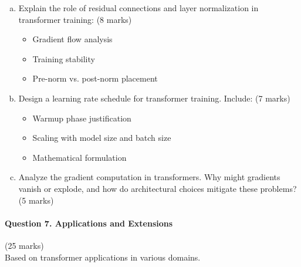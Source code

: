 \documentclass[12pt]{article}
\newcommand{\shortanswer}{\vspace{2cm}}
\newcommand{\mediumanswer}{\vspace{3cm}}
\begin{document}
\begin{enumerate}[(a)]
    \item Explain the role of residual connections and layer normalization in transformer training: \hfill (8 marks)
    \begin{itemize}
        \item Gradient flow analysis
        \item Training stability
        \item Pre-norm vs. post-norm placement
    \end{itemize}
    
    \mediumanswer
    
    \item Design a learning rate schedule for transformer training. Include: \hfill (7 marks)
    \begin{itemize}
        \item Warmup phase justification
        \item Scaling with model size and batch size
        \item Mathematical formulation
    \end{itemize}
    
    \mediumanswer
    
    \item Analyze the gradient computation in transformers. Why might gradients vanish or explode, and how do architectural choices mitigate these problems? \hfill (5 marks)
    
    \shortanswer
\end{enumerate}

\newpage
\paragraph{Question 7. Applications and Extensions}\hfill (25 marks)\\
Based on transformer applications in various domains.
\end{document}
